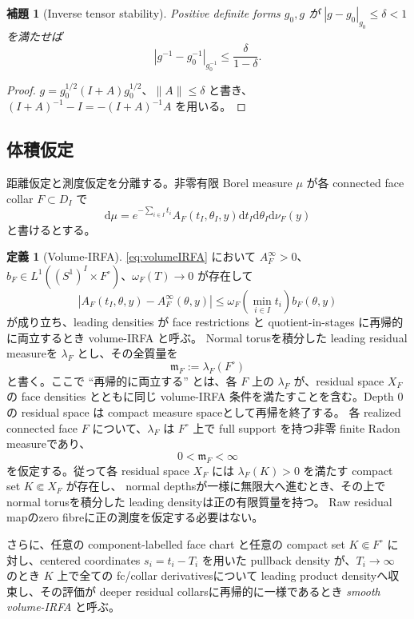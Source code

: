 \documentclass[11pt,a4paper]{ltjsarticle}
\newcommand{\dd}{\mathrm d}
\theoremstyle{plain}
\newtheorem{lemma}[lemma]{補題}
\theoremstyle{definition}
\newtheorem{definition}[definition]{定義}
\theoremstyle{remark}
\begin{document}
\begin{lemma}[Inverse tensor stability]
\label{lem:inverse}
Positive definite forms $g_0,g$ が $|g-g_0|_{g_0}\le\delta<1$ を満たせば
\[
 |g^{-1}-g_0^{-1}|_{g_0^{-1}}\le\frac{\delta}{1-\delta}.
\]
\end{lemma}
\begin{proof}
$g=g_0^{1/2}(I+A)g_0^{1/2}$、$\|A\|\le\delta$ と書き、
$(I+A)^{-1}-I=-(I+A)^{-1}A$ を用いる。
\end{proof}

\subsection{体積仮定}
距離仮定と測度仮定を分離する。非零有限 Borel measure $\mu$ が各 connected face collar $F\subset D_I$ で
\begin{equation}
\label{eq:volumeIRFA}
 \dd\mu=e^{-\sum_{i\in I}t_i}
 A_F(t_I,\theta_I,y)\dd t_I\dd\theta_I\dd\nu_F(y)
\end{equation}
と書けるとする。

\begin{definition}[Volume-IRFA]
\label{def:volumeIRFA}
\eqref{eq:volumeIRFA} において $A_F^\infty>0$、$b_F\in L^1((S^1)^I\times F^\circ)$、$\omega_F(T)\to0$ が存在して
\begin{equation}
\label{eq:volume-domination}
 |A_F(t_I,\theta,y)-A_F^\infty(\theta,y)|
 \le\omega_F(\min_{i\in I}t_i)b_F(\theta,y)
\end{equation}
が成り立ち、leading densities が face restrictions と quotient-in-stages に再帰的に両立するとき volume-IRFA と呼ぶ。
Normal torusを積分した leading residual measureを $\lambda_F$ とし、その全質量を
\[
  \mathfrak m_F:=\lambda_F(F^\circ)
\]
と書く。ここで ``再帰的に両立する'' とは、各 $F$ 上の $\lambda_F$ が、residual space $X_F$ の face densities とともに同じ volume-IRFA 条件を満たすことを含む。Depth $0$ の residual space は compact measure spaceとして再帰を終了する。
各 realized connected face $F$ について、$\lambda_F$ は $F^\circ$ 上で full support を持つ非零 finite Radon measureであり、
\begin{equation}
\label{eq:face-mass-positive}
  0<\mathfrak m_F<\infty
\end{equation}
を仮定する。従って各 residual space $X_F$ には
$\lambda_F(K)>0$ を満たす compact set $K\Subset X_F$ が存在し、
normal depthsが一様に無限大へ進むとき、その上でnormal torusを積分した
leading densityは正の有限質量を持つ。
Raw residual mapのzero fibreに正の測度を仮定する必要はない。

さらに、任意の component-labelled face chart と任意の compact set $K\Subset F^\circ$ に対し、centered coordinates $s_i=t_i-T_i$ を用いた pullback density が、$T_i\to\infty$ のとき $K$ 上で全ての fc/collar derivativesについて leading product densityへ収束し、その評価が deeper residual collarsに再帰的に一様であるとき \emph{smooth volume-IRFA} と呼ぶ。
\end{definition}
\end{document}
